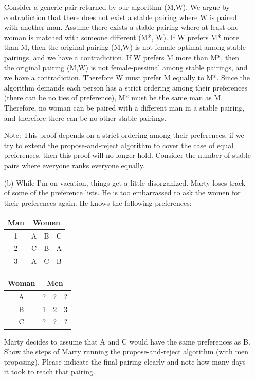 \documentclass[11pt]{article}
\begin{document}
\begin{qunlist}
\begin{itemize}
{Consider a generic pair returned by our algorithm (M,W). We argue by contradiction that there does not exist a stable pairing where W is paired with another man.
Assume there exists a stable pairing where at least one woman is matched with someone different (M*, W). If W prefers M* more than M, then the original pairing (M,W) is not female-optimal among stable pairings, and we have a contradiction. If W prefers M more than M*, then the original pairing (M,W) is not female-pessimal among stable pairings, and we have a contradiction. Therefore W must prefer M equally to M*. Since the algorithm demands each person has a strict ordering among their preferences (there can be no ties of preference), M* must be the same man as M. Therefore, no woman can be paired with a different man in a stable pairing, and therefore there can be no other stable pairings.

Note: This proof depends on a strict ordering among their preferences, if we try to extend the propose-and-reject algorithm to cover the case of equal preferences, then this proof will no longer hold. Consider the number of stable pairs where everyone ranks everyone equally.
}
\fi


\item[(b)] While I'm on vacation, things get a little disorganized. 
Marty loses track of some of the preference lists. 
He is too embarrassed to ask the women for their preferences again. He knows the following preferences:

\begin{center}
\begin{tabular}{|c|ccc|}\hline 
Man&\multicolumn{3}{|c|}{Women}\\\hline 
1&A&B&C\\\hline 
2&C&B&A\\\hline 
3&A&C&B\\\hline
\end{tabular} 
\hspace{2cm}
\begin{tabular}{|c|ccc|}\hline 
Woman&\multicolumn{3}{|c|}{Men}\\\hline 
A&?&?&?\\\hline 
B&1&2&3\\\hline 
C&?&?&?\\\hline
\end{tabular}
\end{center}
   
Marty decides to assume that A and C would have the same preferences as B. 
Show the steps of Marty running the propose-and-reject algorithm (with men proposing). 
Please indicate the final pairing clearly and note how many days it took to reach that pairing.


\end{itemize}
\end{qunlist}
\end{document}
